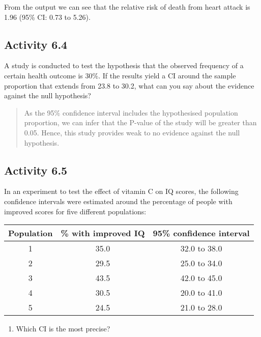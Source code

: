 \documentclass[
]{memoir}
\providecommand{\tightlist}{%
  \setlength{\itemsep}{0pt}\setlength{\parskip}{0pt}}
\begin{document}
From the output we can see that the relative risk of death from heart attack is 1.96 (95\% CI: 0.73 to 5.26).

\hypertarget{activity-6.4}{%
\subsection*{Activity 6.4}\label{activity-6.4}}

A study is conducted to test the hypothesis that the observed frequency of a certain health outcome is 30\%. If the results yield a CI around the sample proportion that extends from 23.8 to 30.2, what can you say about the evidence against the null hypothesis?

\begin{quote}
As the 95\% confidence interval includes the hypothesised population proportion, we can infer that the P-value of the study will be greater than 0.05. Hence, this study provides weak to no evidence against the null hypothesis.
\end{quote}

\hypertarget{activity-6.5}{%
\subsection*{Activity 6.5}\label{activity-6.5}}

In an experiment to test the effect of vitamin C on IQ scores, the following confidence intervals were estimated around the percentage of people with improved scores for five different populations:

\begin{longtable}[]{@{}ccc@{}}
\toprule
Population & \% with improved IQ & 95\% confidence interval \\
\midrule
\endhead
1 & 35.0 & 32.0 to 38.0 \\
2 & 29.5 & 25.0 to 34.0 \\
3 & 43.5 & 42.0 to 45.0 \\
4 & 30.5 & 20.0 to 41.0 \\
5 & 24.5 & 21.0 to 28.0 \\
\bottomrule
\end{longtable}

\begin{enumerate}
\def\labelenumi{\alph{enumi})}
\tightlist
\item
  Which CI is the most precise?
\end{enumerate}
\end{document}

